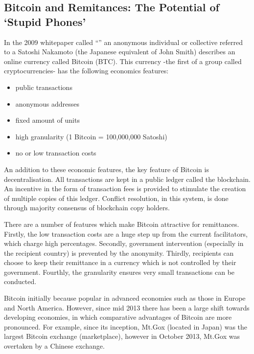 \documentclass[a4paper]{report}\usepackage{graphicx, color}
\begin{document}
\begin{refsection}
\chapter{Bitcoin and Remitances: The Potential of `Stupid Phones'}
\label{bitcoin}
In the 2009 whitepaper \parencite{nakamoto2008bitcoin} called ``'' an anonymous individual or collective referred to a Satoshi Nakamoto (the Japanese equivalent of John Smith) describes an online currency called Bitcoin (BTC). This currency -the first of a group called cryptocurrencies- has the following economics features:

\begin{itemize}
\item public transactions
\item anonymous addresses
\item fixed amount of units
\item high granularity (1 Bitcoin = 100,000,000 Satoshi)
\item no or low transaction costs
\end{itemize}

An addition to these economic features, the key feature of Bitcoin is decentralisation. All transactions are kept in a public ledger called the blockchain. An incentive in the form of transaction fees is provided to stimulate the creation of multiple copies of this ledger. Conflict resolution, in this system, is done through majority consensus of blockchain copy holders.

There are a number of features which make Bitcoin attractive for remittances. Firstly, the low transaction costs are a huge step up from the current facilitators, which charge high percentages. Secondly, government intervention (especially in the recipient country) is prevented by the anonymity. Thirdly, recipients can choose to keep their remittance in a currency which is not controlled by their government. Fourthly, the granularity ensures very small transactions can be conducted.

Bitcoin initially because popular in advanced economies such as those in Europe and North America. However, since mid 2013 there has been a large shift towards developing economies, in which comparative advantages of Bitcoin are more pronounced. For example, since its inception, Mt.Gox (located in Japan) was the largest Bitcoin exchange (marketplace), however in October 2013, Mt.Gox was overtaken by a Chinese exchange.


\end{refsection}
\end{document}
